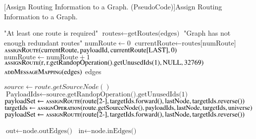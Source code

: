 \begin{breakablealgorithm}
	[Assign Routing Information to a Graph. (PseudoCode)]{Assign Routing Information to a Graph.}\label{alg:simpleRouting}
	\begin{algorithmic}[1]
		\label{alg:assignRouting-line}
		\Throw "At least one route is required"
		\EndIf
		\State $\text{routes} \gets \text{getRoutes(edges)}$\label{alg:startAssignValidRoutes-line}
		\Throw "Graph has not enough redundant routes"
		\EndIf
		\State $\text{numRoute} \gets 0$
		\State $\text{currentRoute} \gets \text{routes[numRoute]}$
		\State $\Call{assignRoute}{\text{currentRoute}, \text{payloadId}, \text{currentRoute[LAST]},0}$
		\State $\text{numRoute} \gets \text{numRoute} + 1$
		\EndWhile\label{alg:endAssignValidRoutes-line}
		\label{alg:startAssignUnusedRoutes-line}
		\State $\Call{assignRoute}{\text{r}, \text{r.getRandopOperation().getUnusedIds(1)}, \text{NULL},32769}$
		\EndFor\label{alg:endAssignUnusedRoutes-line}
		\State $\Call{addMessageMapping}{\text{edges}}$
		\Return edges
		\EndFunction
		\item[]		
		\label{alg:startAssignRoute-line}
		\State $source \gets route.getSourceNode()$
		\State $\text{PayloadIds} \gets \text{source.getRandopOperation().getUnusedIds(1)}$
		\State $\text{payloadSet} \gets \Call{assignRoute}{\text{route[2-]}, \text{targetIds.forward()}, \text{lastNode}, \text{targetIds.reverse()}}$
		\Else
		\State $\text{targetIds}  \gets \Call{assignOperation}{\text{route.getSourceNode()}, \text{payloadIds}, \text{lastNode}, \text{targetIds}, \text{universe}}$
		\State $\text{payloadSet} \gets \Call{assignRoute}{\text{route[2-]}, \text{targetIds.forward()}, \text{lastNode}, \text{targetIds.reverse()}}$
		\EndIf	
		\EndFunction\label{alg:endAssignRoute-line}
		\item[]		
		\label{alg:startAssignOperation-line}
		\State $\text{out} \gets \text{node.outEdges()}$
		\State $\text{in} \gets \text{node.inEdges()}$

\end{algorithmic}
\end{breakablealgorithm}
